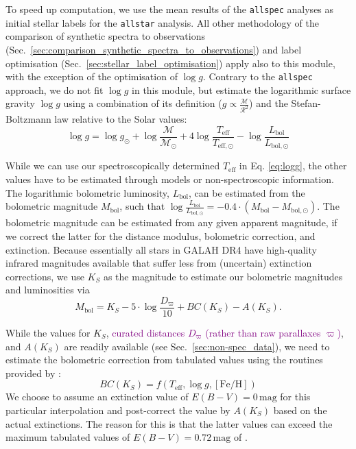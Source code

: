 \documentclass[
  journal=pasa,
  manuscript=research-paper, %
  year=2024,
  volume=37
]{cup-journal}
\newcommand{\adjusted}[1]{{\textcolor{purple}{#1}}}
\newcommand{\logg}{$\log g$\xspace}
\begin{document}
To speed up computation, we use the mean results of the \texttt{allspec} analyses as initial stellar labels for the \texttt{allstar} analysis. All other methodology of the comparison of synthetic spectra to observations (Sec.~\ref{sec:comparison_synthetic_spectra_to_observations}) and label optimisation (Sec.~\ref{sec:stellar_label_optimisation}) apply also to this module, with the exception of the optimisation of \logg. Contrary to the \texttt{allspec} approach, we do not fit \logg in this module, but estimate the logarithmic surface gravity $\log g$ using a combination of its definition ($g \propto \frac{\mathcal{M}}{\mathcal{R}^2}$) and the Stefan-Boltzmann law relative to the Solar values:
\begin{equation}
\log g = \log g_\odot + \log \frac{\mathcal{M}}{\mathcal{M_\odot}} + 4 \log \frac{T_\mathrm{eff}}{T_\mathrm{eff,\odot}} - \log \frac{L_\mathrm{bol}}{L_\mathrm{bol,\odot}} \label{eq:logg}
\end{equation}

While we can use our spectroscopically determined $T_\mathrm{eff}$ in Eq. \ref{eq:logg}, the other values have to be estimated through models or non-spectroscopic information. The logarithmic bolometric luminosity, $L_\mathrm{bol}$, can be estimated from the bolometric magnitude $M_\mathrm{bol}$, such that $\log \frac{L_\mathrm{bol}}{L_\mathrm{bol,\odot}} = -0.4 \cdot \left(M_\mathrm{bol} - M_\mathrm{bol,\odot} \right)$. The bolometric magnitude can be estimated from any given apparent magnitude, if we correct the latter for the distance modulus, bolometric correction, and extinction. Because essentially all stars in GALAH DR4 have high-quality infrared magnitudes available that suffer less from (uncertain) extinction corrections, we use $K_S$ as the magnitude to estimate our bolometric magnitudes and luminosities via
\begin{equation}
M_\mathrm{bol} = K_S - 5\cdot \log \frac{D_\varpi}{10} + BC(K_S) - A(K_S). \label{eq:mbol}
\end{equation}

While the values for $K_S$, \adjusted{curated distances $D_\varpi$ (rather than raw parallaxes $\varpi$)}, and $A(K_S)$ are readily available (see Sec.~\ref{sec:non-spec_data}), we need to estimate the bolometric correction from tabulated values using the routines provided by \citet{Casagrande2018}:
\begin{equation}
BC(K_S) = f(T_\mathrm{eff}, \log g, \mathrm{[Fe/H]})
\label{eq:bc_ks}
\end{equation}
We choose to assume an extinction value of $E(B-V) = 0\,\mathrm{mag}$ for this particular interpolation and post-correct the value by $A(K_S)$ based on the actual extinctions. The reason for this is that the latter values can exceed the maximum tabulated values of $E(B-V) = 0.72\,\mathrm{mag}$ of \citet{Casagrande2018}.
\end{document}

